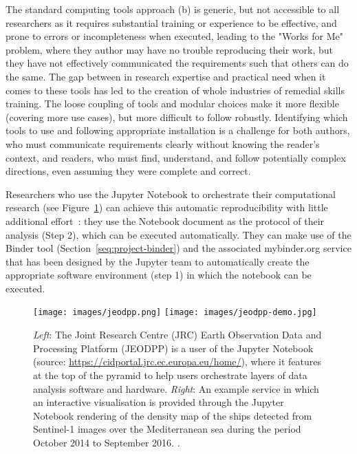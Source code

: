 The standard computing tools approach (b) is generic, but not accessible to all researchers
as it requires substantial training or experience to be effective,
and prone to errors or incompleteness when executed,
leading to the "Works for Me" problem,
where they author may have no trouble reproducing their work,
but they have not effectively communicated the requirements such that others can do the same.
The gap between in research expertise and practical need when it comes to these tools has led to the creation of whole industries of remedial skills training.
The loose coupling of tools and modular choices make it more flexible (covering more use cases),
but more difficult to follow robustly.
Identifying which tools to use and following appropriate installation is a challenge
for both authors, who must communicate requirements clearly without knowing the reader's context,
and readers, who must find, understand, and follow potentially complex directions, even assuming they were complete and correct.

\medskip Researchers who use the Jupyter Notebook to orchestrate their
computational research (see Figure~\ref{fig:jeodpp}) can achieve this automatic
reproducibility with little additional effort~\cite{Beg2021}: they use the Notebook document as
the protocol of their analysis (Step 2), which can be executed automatically.
They can make use of the Binder tool (Section~\ref{seq:project-binder}) and the
associated mybinder.org service that has
been designed by the Jupyter team to automatically create the appropriate
software environment (step 1) in which the notebook can be executed.

\begin{figure}[tb]
  \centering\texttt{[image: images/jeodpp.png]}
  \centering\texttt{[image: images/jeodpp-demo.jpg]}
  \caption{\emph{Left}: The Joint Research Centre (JRC) Earth Observation
    Data and Processing Platform (JEODPP) is a user of the
    Jupyter Notebook (source:
    \url{https://cidportal.jrc.ec.europa.eu/home/}), where it features
    at the top of the pyramid to help users orchestrate layers of data
    analysis software and hardware. \emph{Right}: An example
    service in which an interactive visualisation is provided through
    the Jupyter Notebook rendering of the density map of the ships
    detected from Sentinel-1 images over the Mediterranean sea during
    the period October 2014 to September 2016. \cite[Figure
    6]{Soille2018}. \label{fig:jeodpp}}
\end{figure}


